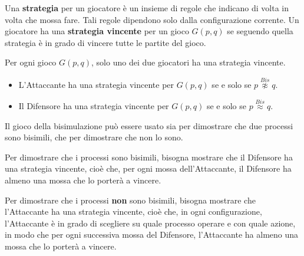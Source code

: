 Una \textbf{strategia} per un giocatore è un insieme di regole che indicano di
volta in volta che mossa fare. Tali regole dipendono solo dalla configurazione
corrente. Un giocatore ha una \textbf{strategia vincente} per un gioco $G(p, q)$
se seguendo quella strategia è in grado di vincere tutte le partite del gioco.
\begin{teorema}
    Per ogni gioco $G(p, q)$, solo uno dei due giocatori ha una strategia vincente.
    \begin{itemize}
        \item L'Attaccante ha una strategia vincente per $G(p, q)$ se e solo se
              $p \stackrel{Bis}{\not\approx} q$.
        \item Il Difensore ha una strategia vincente per $G(p, q)$ se e solo se
              $p \stackrel{Bis}{\approx} q$.
    \end{itemize}
\end{teorema}
\begin{nota}
    Il gioco della bisimulazione può essere usato sia per dimostrare che due
    processi sono bisimili, che per dimostrare che non lo sono.
\end{nota}
Per dimostrare che i processi sono bisimili, bisogna mostrare che il Difensore
ha una strategia vincente, cioè che, per ogni mossa dell'Attaccante, il Difensore
ha almeno una mossa che lo porterà a vincere.

Per dimostrare che i processi \textbf{non} sono bisimili, bisogna mostrare che
l'Attaccante ha una strategia vincente, cioè che, in ogni configurazione,
l'Attaccante è in grado di scegliere su quale processo operare e con quale azione,
in modo che per ogni successiva mossa del Difensore, l'Attaccante ha almeno una
mossa che lo porterà a vincere.
